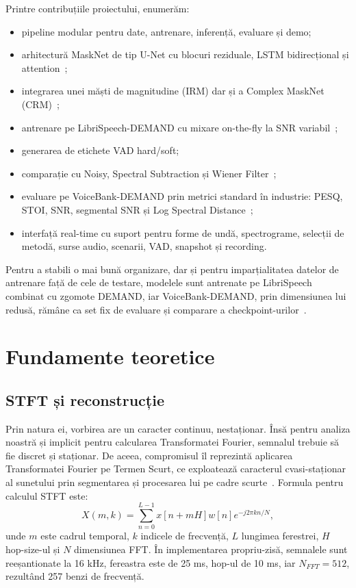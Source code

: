 \documentclass[12pt,a4paper]{report}
\begin{document}
Printre contribuțiile proiectului, enumerăm:
\begin{itemize}
    \item pipeline modular pentru date, antrenare, inferență, evaluare și demo;
    \item arhitectură MaskNet de tip U-Net cu blocuri reziduale, LSTM
    bidirecțional și attention~\cite{unet,resnet,lstm,se};
    \item integrarea unei măști de magnitudine (IRM) dar și a Complex MaskNet (CRM)~\cite{ideal_mask,complex_mask};
    \item antrenare pe LibriSpeech-DEMAND cu mixare on-the-fly la SNR variabil~\cite{librispeech,demand};
    \item generarea de etichete VAD hard/soft;
    \item comparație cu Noisy, Spectral Subtraction și Wiener Filter~\cite{spectral_subtraction,wiener};
    \item evaluare pe VoiceBank-DEMAND prin metrici standard în industrie: PESQ, STOI, SNR, segmental SNR și Log Spectral Distance~\cite{voicebank_demand,pesq,stoi,lsd};
    \item interfață real-time cu suport pentru forme de undă, spectrograme, selecții de metodă, surse audio, scenarii, VAD, snapshot și recording.
\end{itemize}

Pentru a stabili o mai bună organizare, dar și pentru imparțialitatea datelor de antrenare față de cele de testare, 
modelele sunt antrenate pe LibriSpeech combinat cu zgomote DEMAND, iar VoiceBank-DEMAND, prin dimensiunea lui redusă, 
rămâne ca set fix de evaluare și comparare a checkpoint-urilor~\cite{librispeech,demand,voicebank_demand}.

\chapter{Fundamente teoretice}

\section{STFT și reconstrucție}

Prin natura ei, vorbirea are un caracter continuu, nestaționar. 
Însă pentru analiza noastră și implicit pentru calcularea Transformatei Fourier, 
semnalul trebuie să fie discret și staționar. De aceea, compromisul îl reprezintă 
aplicarea Transformatei Fourier pe Termen Scurt, ce exploatează caracterul 
cvasi-staționar al sunetului prin segmentarea și procesarea lui pe cadre scurte~\cite{stft}. 
Formula pentru calculul STFT este:
\[
X(m,k)=\sum_{n=0}^{L-1}x[n+mH]w[n]e^{-j2\pi kn/N},
\]
unde \(m\) este cadrul temporal, \(k\) indicele de frecvență, \(L\) lungimea ferestrei, \(H\) hop-size-ul  și \(N\) dimensiunea FFT. 
În implementarea propriu-zisă, semnalele sunt reeșantionate la 16 kHz, fereastra este de 25 ms, hop-ul de 10 ms, 
iar \(N_{FFT}=512\), rezultând 257 benzi de frecvență.
\end{document}
